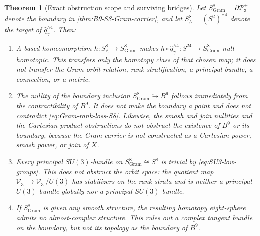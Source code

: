 \documentclass[11pt,letterpaper]{article}
\numberwithin{equation}{section}
\newtheorem{theorem}{Theorem}[section]
\theoremstyle{definition}
\theoremstyle{remark}
\begin{document}
\begin{theorem}[Exact obstruction scope and surviving bridges]
\label{thm:Gram-carrier-separation}
Let \(S^8_{\mathrm{Gram}}=\partial\mathcal P_3^+\) denote the boundary in
\cref{thm:B9-S8-Gram-carrier}, and let
\(S^8_{\wedge}=(S^2)^{\wedge4}\) denote the target of
\(\widehat q_\gamma^{\wedge4}\).  Then:
\begin{enumerate}[label=\textup{(\roman*)}]
\item A based homeomorphism
\(h:S^8_{\wedge}\to S^8_{\mathrm{Gram}}\) makes
\(h\circ\widehat q_\gamma^{\wedge4}:S^{24}\to S^8_{\mathrm{Gram}}\)
null-homotopic.  This transfers only the homotopy class of that chosen map;
it does not transfer the Gram orbit relation, rank stratification, a
principal bundle, a connection, or a metric.

\item The nullity of the boundary inclusion
\(S^8_{\mathrm{Gram}}\hookrightarrow B^9\) follows immediately from the
contractibility of \(B^9\).  It does not make the boundary a point and does
not contradict \cref{eq:Gram-rank-loss-S8}.  Likewise, the smash and join
nullities and the Cartesian-product obstructions do not obstruct the
existence of \(B^9\) or its boundary, because the Gram carrier is not
constructed as a Cartesian power, smash power, or join of \(X\).

\item Every principal \(SU(3)\)-bundle on
\(S^8_{\mathrm{Gram}}\cong S^8\) is trivial by
\cref{eq:SU3-low-groups}.  This does not obstruct the orbit space: the
quotient map \(\mathcal V_3^+\to\mathcal V_3^+/U(3)\) has stabilizers on
the rank strata and is neither a principal \(U(3)\)-bundle globally nor a
principal \(SU(3)\)-bundle.

\item If \(S^8_{\mathrm{Gram}}\) is given any smooth structure, the
resulting homotopy eight-sphere admits no almost-complex structure.  This
rules out a complex tangent bundle on the boundary, but not its topology
as the boundary of \(B^9\).


\end{enumerate}
\end{theorem}
\end{document}

